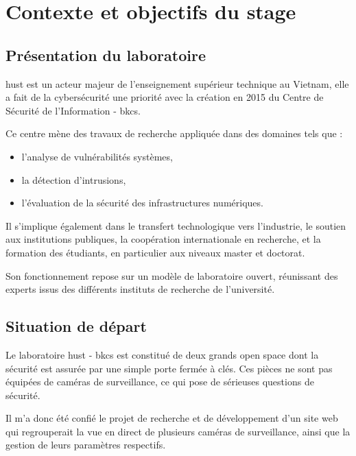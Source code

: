 \newpage
\chapter{Contexte et objectifs du stage}


\section{Présentation du laboratoire} 

\acrshort{hust} est un acteur majeur de l’enseignement supérieur technique au Vietnam, elle a fait de la cybersécurité une priorité avec la création en 2015 du Centre de Sécurité de l’Information - \acrshort{bkcs}.

Ce centre mène des travaux de recherche appliquée dans des domaines tels que :
\begin{itemize}
	\item l’analyse de vulnérabilités systèmes,
	\item la détection d’intrusions,
	\item l’évaluation de la sécurité des infrastructures numériques.
\end{itemize}
\vspace{10px}

Il s’implique également dans le transfert technologique vers l’industrie, le soutien aux institutions publiques, la coopération internationale en recherche, et la formation des étudiants, en particulier aux niveaux master et doctorat. 

Son fonctionnement repose sur un modèle de laboratoire ouvert, réunissant des experts issus des différents instituts de recherche de l’université.





\section{Situation de départ}

Le laboratoire \acrshort{hust} - \acrshort{bkcs} est constitué de deux grands open space dont la sécurité est assurée par une simple porte fermée à clés. Ces pièces ne sont pas équipées de caméras de surveillance, ce qui pose de sérieuses questions de sécurité. 

Il m'a donc été confié le projet de recherche et de développement d'un site web qui regrouperait la vue en direct de plusieurs caméras de surveillance, ainsi que la gestion de leurs paramètres respectifs.


